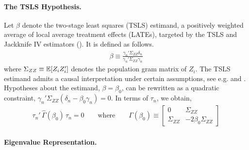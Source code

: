 \paragraph*{The TSLS Hypothesis.}
Let \(\beta\) denote the two-stage least squares (TSLS) estimand,  a  positively weighted average of local average treatment effects (LATEs), targeted by the TSLS and Jackknife IV estimators (\citealp{kolesarEstimationInstrumentalVariables2013}). It is defined as follows.
\begin{align}
    \beta \equiv \frac{\gamma_n'\Sigma_{ZZ}\delta_n}{\gamma_n'\Sigma_{ZZ}\gamma_n}
\end{align}
where \(\Sigma_{ZZ}\equiv \mathbb{E}[Z_iZ_i']\) denotes the population gram matrix of \(Z_i\).
The TSLS estimand admits a causal interpretation under certain assumptions, see e.g. \cite{angristTwoStageLeastSquares1995} and \cite{mogstadCausalInterpretationTwoStage2021}.
Hypotheses about the estimand, \(\beta=\beta_0\), can be rewritten as a quadratic constraint, \(\gamma_n'\Sigma_{ZZ}(\delta_n -\beta_0\gamma_n) = 0\).
In terms of \(\tau_n\), we obtain,
\begin{align}
    \tau_n'\,\hat\Gamma(\beta_0) \,\tau_n = 0 \qquad \text{where} \qquad
    \Gamma(\beta_0) \equiv 
    \begin{bmatrix}
        0 & \Sigma_{ZZ} \\
        \Sigma_{ZZ} & -2\beta_0\Sigma_{ZZ}
    \end{bmatrix}
\end{align}

\paragraph*{Eigenvalue Representation.}

